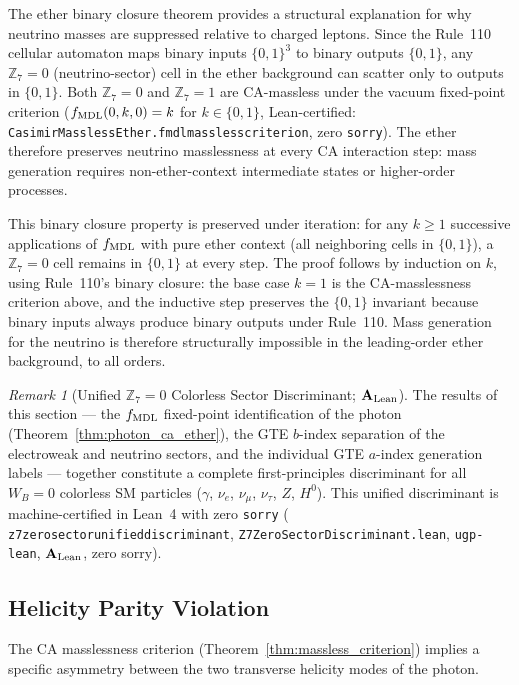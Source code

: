 \documentclass[11pt]{article}
\theoremstyle{remark}
\newtheorem{remark}[theorem]{Remark}
\newcommand{\lean}[1]{%
  \penalty-100
  \begingroup\def\_{\textunderscore\allowbreak}\texttt{#1}\endgroup}
\newcommand{\CatAL}{\ensuremath{\textbf{A}_{\rm Lean}}}
\begin{document}
The ether binary closure theorem provides a structural explanation for why
neutrino masses are suppressed relative to charged leptons.
Since the Rule~110 cellular automaton maps binary inputs $\{0,1\}^3$ to
binary outputs $\{0,1\}$, any $\mathbb{Z}_7=0$ (neutrino-sector) cell in the
ether background can scatter only to outputs in $\{0,1\}$.
Both $\mathbb{Z}_7=0$ and $\mathbb{Z}_7=1$ are CA-massless under the vacuum
fixed-point criterion ($f_{\rm MDL}(0,k,0)=k$ for $k\in\{0,1\}$,
Lean-certified: \lean{CasimirMasslessEther.fmdl\_massless\_criterion},
zero \texttt{sorry}).
The ether therefore preserves neutrino masslessness at every CA interaction
step: mass generation requires non-ether-context intermediate states or
higher-order processes.

This binary closure property is preserved under iteration: for any $k \geq 1$
successive applications of $f_{\rm MDL}$ with pure ether context (all
neighboring cells in $\{0,1\}$), a $\mathbb{Z}_7=0$ cell remains in
$\{0,1\}$ at every step.
The proof follows by induction on $k$, using Rule~110's binary closure: the
base case $k=1$ is the CA-masslessness criterion above, and the inductive
step preserves the $\{0,1\}$ invariant because binary inputs always produce
binary outputs under Rule~110.
Mass generation for the neutrino is therefore structurally impossible in the
leading-order ether background, to all orders.

\begin{remark}[Unified $\mathbb{Z}_7=0$ Colorless Sector Discriminant; $\CatAL$]
\label{rem:z7_zero_unified_discriminant}
The results of this section --- the $f_{\rm MDL}$ fixed-point identification of the photon
(Theorem~\ref{thm:photon_ca_ether}), the GTE $b$-index separation of the electroweak
and neutrino sectors, and the individual GTE $a$-index generation labels --- together
constitute a complete first-principles discriminant for all $W_B{=}0$ colorless SM
particles ($\gamma$, $\nu_e$, $\nu_\mu$, $\nu_\tau$, $Z$, $H^0$).
This unified discriminant is machine-certified in Lean~4 with zero \texttt{sorry}
(\lean{z7\_zero\_sector\_unified\_discriminant}, \lean{Z7ZeroSectorDiscriminant.lean},
\texttt{ugp-lean}, $\CatAL$, zero sorry).
\end{remark}

\subsection{Helicity Parity Violation}
\label{sec:helicity}

The CA masslessness criterion (Theorem~\ref{thm:massless_criterion}) implies
a specific asymmetry between the two transverse helicity modes of the photon.
\end{document}

